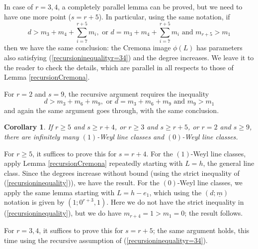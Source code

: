 \documentclass[12pt]{article}
\newtheorem{corollary}[equation]{Corollary}
\numberwithin{equation}{section}
\numberwithin{subeq}{equation}
\begin{document}
In case of $r = 3, 4$, a completely parallel lemma can be proved, but we need to have one more point ($s=r+5$).  In particular, using the same notation, if
\begin{equation}\label{recursioninequalityr=34}
d > m_3+m_4+\sum_{i=7}^{r+5} m_i, 
\text{ or } d = m_3+m_4+\sum_{i=7}^{r+5} m_i \text{ and } m_{r+5} > m_1
\end{equation}
then we have the same conclusion:
the Cremona image $\phi(L)$ has parameters also satisfying 
(\ref{recursioninequalityr=34}) and the degree increases.
We leave it to the reader to check the details,
which are parallel in all respects to those of Lemma \ref{recursionCremona}.

For $r=2$ and $s=9$, the recursive argument requires the inequality
\begin{equation}\label{recursioninequalityr=2}
d > m_3+m_6+m_9, 
\text{ or } d = m_3+m_6+m_9 \text{ and } m_9 > m_1
\end{equation}
and again the same argument goes through, with the same conclusion.


\begin{corollary}\label{infinite01rgeq5}
If $r \geq 5$ and $s \geq r+4$,
or $r \geq 3$ and $s \geq r+5$,
or $r=2$ and $s \geq 9$, there are infinitely many $(1)$-Weyl line classes
and $(0)$-Weyl line classes.
\end{corollary}

\medskip{}
For $r \geq 5$, it suffices to prove this for $s = r+4$.
For the $(1)$-Weyl line classes, apply Lemma \ref{recursionCremona} repeatedly starting with $L=h$, the general line class.
Since the degrees increase without bound
(using the strict inequality of (\ref{recursioninequality})), we have the result.
For the $(0)$-Weyl line classes, we apply the same lemma
starting with $L=h-e_1$, which using the $(d;\underline{m})$ notation
is given by $(1;0^{r+3},1)$.
Here we do not have the strict inequality in (\ref{recursioninequality}), but we do have $m_{r+4}=1 > m_1=0$; the result follows.

For $r = 3,4$, it suffices to prove this for $s = r+5$;
the same argument holds, this time using the recursive assumption of (\ref{recursioninequalityr=34}).
\end{document}
